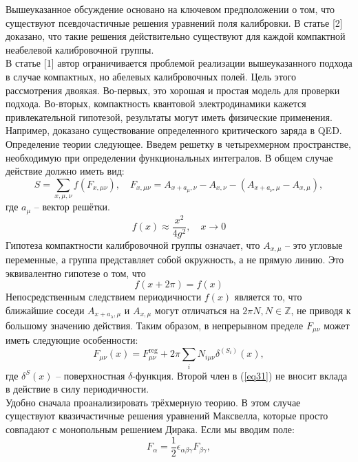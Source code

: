 \documentclass[12pt]{article}
\theoremstyle{definition}
\begin{document}
Вышеуказанное обсуждение основано на ключевом предположении о том, что существуют псевдочастичные решения уравнений поля калибровки. В статье [2] доказано, что такие решения действительно существуют для каждой компактной неабелевой калибровочной группы.\\
В статье [1] автор ограничивается проблемой реализации вышеуказанного подхода в случае компактных, но абелевых калибровочных полей. Цель этого рассмотрения двоякая. Во-первых, это хорошая и простая модель для проверки подхода. Во-вторых, компактность квантовой электродинамики кажется привлекательной гипотезой, результаты могут иметь физические применения. Например, доказано существование определенного критического заряда в QED.\\
Определение теории следующее. Введем решетку в четырехмерном пространстве, необходимую при определении функциональных интегралов. В общем случае действие должно иметь вид:
\begin{equation}
    S=\sum\limits_{x,\mu,\nu}f(F_{x,\mu\nu}),\quad F_{x,\mu\nu}=A_{x+a_\mu,\nu}-A_{x,\nu}-(A_{x+a_\nu,\mu}-A_{x,\mu}),
\end{equation}
где $a_\mu$ -- вектор решётки.
\begin{equation}
    f(x)\approx\frac{x^2}{4g^2},\quad x\rightarrow 0
\end{equation}
Гипотеза компактности калибровочной группы означает, что $A_{x,\mu}$ -- это угловые переменные, а группа представляет собой окружность, а не прямую линию. Это эквивалентно гипотезе о том, что
\begin{equation}
    f(x+2\pi)=f(x)
\end{equation}
Непосредственным следствием периодичности $f(x)$ является то, что ближайшие соседи $A_{x+a_\lambda,\mu}$ и $A_{x,\mu}$ могут отличаться на $2\pi N,N\in\mathbb{Z}$, не приводя к большому значению действия. Таким образом, в непрерывном пределе $F_{\mu\nu}$ может иметь следующие особенности:
\begin{equation}\label{eq31}
    F_{\mu\nu}(x)=F^{\text{reg}}_{\mu\nu}+2\pi\sum\limits_{i}N_{i\mu\nu}\delta^{(S_i)}(x),
\end{equation}
где $\delta^{S}(x)$ -- поверхностная $\delta$-функция. Второй член в (\ref{eq31}) не вносит вклада в действие в силу периодичности.\\
Удобно сначала проанализировать трёхмерную теорию. В этом случае существуют квазичастичные решения уравнений Максвелла, которые просто совпадают с монопольным решением Дирака. Если мы вводим поле:
\begin{equation}
    F_\alpha=\frac{1}{2}\epsilon_{\alpha\beta\gamma}F_{\beta\gamma},
\end{equation}
\end{document}
